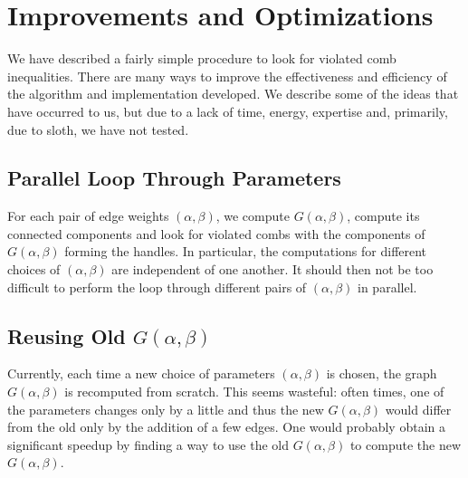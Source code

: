 \documentclass[12pt, letterpaper]{amsart}
\theoremstyle{plain}
\theoremstyle{definition}
\theoremstyle{remark}
\begin{document}
\begin{figure}
\end{figure}
\begin{figure}
\end{figure}
\section{Improvements and Optimizations}\label{sec:opt}
We have described a fairly simple procedure to look for violated comb
inequalities. There are many ways to improve the effectiveness and efficiency
of the algorithm and implementation developed. We describe some of the ideas
that have occurred to us, but due to a lack of time, energy, expertise and,
primarily, due to sloth, we have not tested.

\subsection{Parallel Loop Through Parameters}
For each pair of edge weights $(\alpha, \beta)$, we compute $G(\alpha,\beta)$,
compute its connected components and look for violated combs with the
components of $G(\alpha,\beta)$ forming the handles. In particular, the
computations for different choices of $(\alpha, \beta)$ are independent of one
another. It should then not be too difficult to perform the loop through
different pairs of $(\alpha,\beta)$ in parallel.

\subsection{Reusing Old $G(\alpha,\beta)$}
Currently, each time a new choice of parameters $(\alpha,\beta)$ is chosen, the
graph $G(\alpha,\beta)$ is recomputed from scratch. This seems wasteful: often times,
one of the parameters changes only by a little and thus the new $G(\alpha,\beta)$
would differ from the old only by the addition of a few edges. One would probably
obtain a significant speedup by finding a way to use the old $G(\alpha,\beta)$
to compute the new $G(\alpha,\beta)$.
\end{document}
